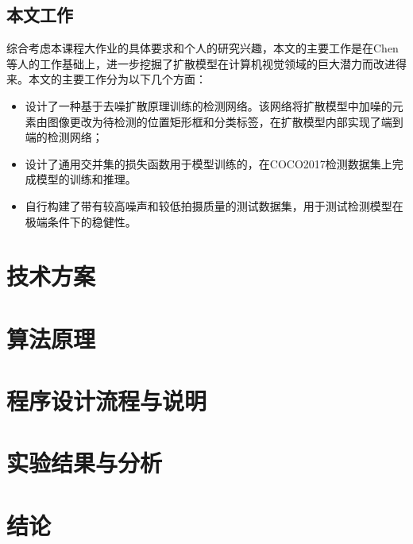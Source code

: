 \documentclass[11pt]{article}
\begin{document}
\subsection{本文工作}
综合考虑本课程大作业的具体要求和个人的研究兴趣，本文的主要工作是在Chen\cite{chenDiffusionDetDiffusionModel2023}等人的工作基础上，进一步挖掘了扩散模型\cite{hoDenoisingDiffusionProbabilistic2020}在计算机视觉领域的巨大潜力而改进得来。本文的主要工作分为以下几个方面：
\begin{itemize}
  \item 设计了一种基于去噪扩散原理训练的检测网络。该网络将扩散模型中加噪的元素由图像更改为待检测的位置矩形框和分类标签，在扩散模型内部实现了端到端的检测网络；
  \item 设计了通用交并集的损失函数用于模型训练的，在COCO2017\cite{linMicrosoftCOCOCommon2014}检测数据集上完成模型的训练和推理。
  \item 自行构建了带有较高噪声和较低拍摄质量的测试数据集，用于测试检测模型在极端条件下的稳健性。
\end{itemize}
\section{技术方案}

\section{算法原理}

\section{程序设计流程与说明}

\section{实验结果与分析}

\section{结论}

\newpage
\printbibliography[heading=bibliography,title=参考文献]
\end{document}
